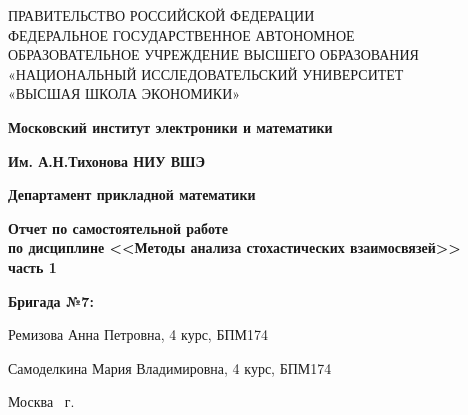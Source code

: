 \begin{titlepage}
	\begin{center}
		ПРАВИТЕЛЬСТВО РОССИЙСКОЙ ФЕДЕРАЦИИ \\
 		ФЕДЕРАЛЬНОЕ  ГОСУДАРСТВЕННОЕ АВТОНОМНОЕ \\
		ОБРАЗОВАТЕЛЬНОЕ УЧРЕЖДЕНИЕ ВЫСШЕГО ОБРАЗОВАНИЯ\\
		«НАЦИОНАЛЬНЫЙ ИССЛЕДОВАТЕЛЬСКИЙ УНИВЕРСИТЕТ\\
		«ВЫСШАЯ ШКОЛА ЭКОНОМИКИ»
	\end{center}
	
	\begin{center}
		\textbf{Московский институт электроники и математики}
		
		\textbf{Им. А.Н.Тихонова НИУ ВШЭ}
		
		\vspace{2ex}
		
		\textbf{Департамент прикладной математики}
	\end{center}
	\vspace{1ex}	
	
	\vspace{1ex}
	\begin{center}
		\textbf{Отчет по самостоятельной работе \\
			по дисциплине <<Методы анализа стохастических взаимосвязей>>\\
			часть 1
	}
	\end{center}	

	\vspace{2ex}
	\vfill
	
	\vspace{2ex}
	
	\begin{flushright}
		\textbf{Бригада №7:}
		
		\vspace{2ex}
		
		Ремизова Анна Петровна, 4 курс, БПМ174
		
		Самоделкина Мария Владимировна, 4 курс, БПМ174

	\end{flushright}

	\vspace{5ex}
	\begin{center}
		Москва \the\year \, г.
	\end{center}
	
\end{titlepage}
\addtocounter{page}{1}